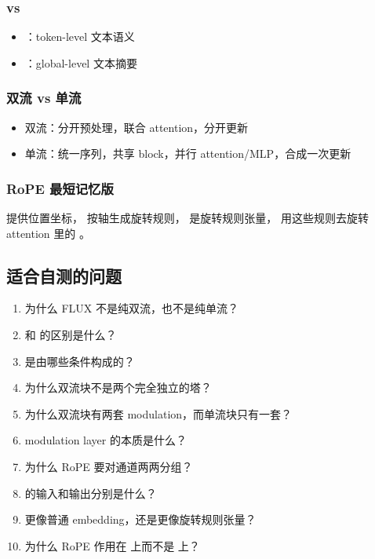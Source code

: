 \subsubsection{ vs }

\begin{itemize}[leftmargin=1.5em]
  \item {}：token-level 文本语义
  \item {}：global-level 文本摘要
\end{itemize}

\subsubsection{双流 vs 单流}

\begin{itemize}[leftmargin=1.5em]
  \item 双流：分开预处理，联合 attention，分开更新
  \item 单流：统一序列，共享 block，并行 attention/MLP，合成一次更新
\end{itemize}

\subsubsection{RoPE 最短记忆版}

\begin{summarybox}
 提供位置坐标， 按轴生成旋转规则， 是旋转规则张量， 用这些规则去旋转 attention 里的 。
\end{summarybox}

\subsection{适合自测的问题}

\begin{enumerate}[leftmargin=1.5em]
  \item 为什么 FLUX 不是纯双流，也不是纯单流？
  \item {} 和  的区别是什么？
  \item {} 是由哪些条件构成的？
  \item 为什么双流块不是两个完全独立的塔？
  \item 为什么双流块有两套 modulation，而单流块只有一套？
  \item modulation layer 的本质是什么？
  \item 为什么 RoPE 要对通道两两分组？
  \item {} 的输入和输出分别是什么？
  \item {} 更像普通 embedding，还是更像旋转规则张量？
  \item 为什么 RoPE 作用在  上而不是  上？
\end{enumerate}

